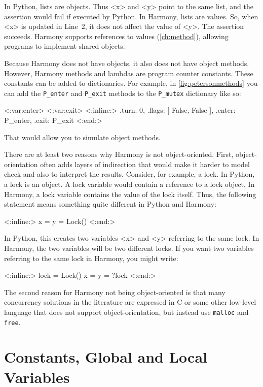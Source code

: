 \documentclass{report}
\newenvironment{code}{
\tcolorbox
}{
\endtcolorbox
}
\begin{document}
In Python, lists are objects.  Thus <{x}> and <{y}> point to the same list,
and the assertion would fail if executed by Python.
In Harmony, lists are values.  So, when <{x}> is updated in Line~2, it does
not affect the value of <{y}>.  The assertion succeeds.
Harmony supports references to values (\autoref{ch:method}),
allowing programs to implement shared objects.

Because Harmony does not have objects, it also does not have object methods.
However, Harmony methods and lambdas are program counter constants.
These constants can be added to dictionaries.
For example, in \autoref{fig:petersonmethods}
you can add the \texttt{P\_enter} and
\texttt{P\_exit} methods to the \texttt{P\_mutex} dictionary
like so:
\begin{code}
<{:var:enter}>
<{:var:exit}>
<{:inline:}>
{ .turn: 0, .flags: [ False, False ], .enter: P_enter, .exit: P_exit }
<{:end:}>
\end{code}
That would allow you to simulate object methods.

There are at least two reasons why Harmony is not object-oriented.
First,
object-orientation often adds layers of indirection that would make it
harder to model check and also to interpret the results.  Consider, for example,
a lock.  In Python, a lock is an object.  A lock variable would contain a
reference to a lock object.  In Harmony, a lock variable contains the value
of the lock itself.
Thus, the following statement means something quite different in Python and
Harmony:

\begin{code}
<{:inline:}>
x = y = Lock()
<{:end:}>
\end{code}

In Python, this creates two variables <{x}> and <{y}> referring to the same lock.
In Harmony, the two variables will be two different locks.  If you want two
variables referring to the same lock in Harmony, you might write:

\begin{code}
<{:inline:}>
lock = Lock()
x = y = ?lock
<{:end:}>
\end{code}

The second reason for Harmony not being object-oriented is that
many concurrency solutions in the literature are
expressed in C or some other low-level language that does not support
object-orientation, but instead use \texttt{malloc} and \texttt{free}.

\section{Constants, Global and Local Variables}\label{sec:vars}
\end{document}
